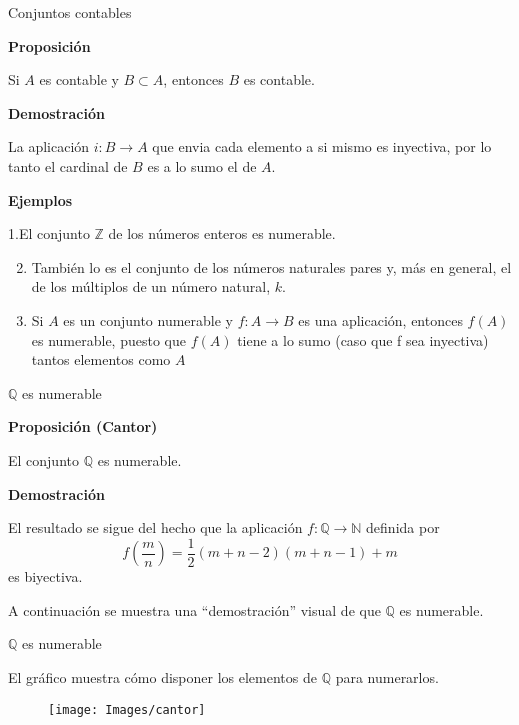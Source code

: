 \documentclass[ignorenonframetext,]{beamer}
\begin{document}
\begin{frame}{Conjuntos contables}
\protect\hypertarget{conjuntos-contables}{}

 \textbf{Proposición}

Si \(A\) es contable y \(B \subset A\), entonces \(B\) es contable.

\textbf{Demostración}

La aplicación \(i: B \rightarrow A\) que envia cada elemento a si mismo
es inyectiva, por lo tanto el cardinal de \(B\) es a lo sumo el de
\(A\).

\textbf{Ejemplos}

1.El conjunto \(\mathbb{Z}\) de los números enteros es numerable.

\begin{enumerate}
\setcounter{enumi}{1}
\item
  También lo es el conjunto de los números naturales pares y, más en
  general, el de los múltiplos de un número natural, \(k\).
\item
  Si \(A\) es un conjunto numerable y \(f:A \rightarrow B\) es una
  aplicación, entonces \(f(A)\) es numerable, puesto que \(f(A)\) tiene
  a lo sumo (caso que f sea inyectiva) tantos elementos como \(A\)
\end{enumerate}

\end{frame}

\begin{frame}{\(\mathbb{Q}\) es numerable}
\protect\hypertarget{mathbbq-es-numerable}{}

 \textbf{Proposición (Cantor)}

El conjunto \(\mathbb{Q}\) es numerable.

\textbf{Demostración}

El resultado se sigue del hecho que la aplicación
\(f: \mathbb{Q} \rightarrow \mathbb{N}\) definida por \[
f \left(\dfrac{m}{n} \right) = \dfrac{1}{2}(m+n-2)(m+n-1)+m
\] es biyectiva.

A continuación se muestra una ``demostración'' visual de que
\(\mathbb{Q}\) es numerable.

\end{frame}

\begin{frame}{\(\mathbb{Q}\) es numerable}
\protect\hypertarget{mathbbq-es-numerable-1}{}

El gráfico muestra cómo disponer los elementos de \(\mathbb{Q}\) para
numerarlos.

\begin{figure}
\texttt{[image: Images/cantor]} \end{figure}

\end{frame}
\end{document}
